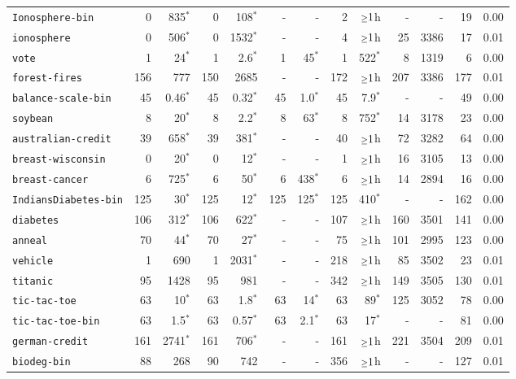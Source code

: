 \begin{tabular}{lrrrrrrrrrrrr}
\texttt{Ionosphere-bin} & 0 & 835$^*$ & 0 & 108$^*$ & - & - & 2 & $\mathsmaller{\geq}1$h & - & - & 19 & 0.00\\
\texttt{ionosphere} & 0 & 506$^*$ & 0 & 1532$^*$ & - & - & 4 & $\mathsmaller{\geq}1$h & 25 & 3386 & 17 & 0.01\\
\texttt{vote} & 1 & 24$^*$ & 1 & 2.6$^*$ & 1 & 45$^*$ & 1 & 522$^*$ & 8 & 1319 & 6 & 0.00\\
\texttt{forest-fires} & 156 & 777 & 150 & 2685 & - & - & 172 & $\mathsmaller{\geq}1$h & 207 & 3386 & 177 & 0.01\\
\texttt{balance-scale-bin} & 45 & 0.46$^*$ & 45 & 0.32$^*$ & 45 & 1.0$^*$ & 45 & 7.9$^*$ & - & - & 49 & 0.00\\
\texttt{soybean} & 8 & 20$^*$ & 8 & 2.2$^*$ & 8 & 63$^*$ & 8 & 752$^*$ & 14 & 3178 & 23 & 0.00\\
\texttt{australian-credit} & 39 & 658$^*$ & 39 & 381$^*$ & - & - & 40 & $\mathsmaller{\geq}1$h & 72 & 3282 & 64 & 0.00\\
\texttt{breast-wisconsin} & 0 & 20$^*$ & 0 & 12$^*$ & - & - & 1 & $\mathsmaller{\geq}1$h & 16 & 3105 & 13 & 0.00\\
\texttt{breast-cancer} & 6 & 725$^*$ & 6 & 50$^*$ & 6 & 438$^*$ & 6 & $\mathsmaller{\geq}1$h & 14 & 2894 & 16 & 0.00\\
\texttt{IndiansDiabetes-bin} & 125 & 30$^*$ & 125 & 12$^*$ & 125 & 125$^*$ & 125 & 410$^*$ & - & - & 162 & 0.00\\
\texttt{diabetes} & 106 & 312$^*$ & 106 & 622$^*$ & - & - & 107 & $\mathsmaller{\geq}1$h & 160 & 3501 & 141 & 0.00\\
\texttt{anneal} & 70 & 44$^*$ & 70 & 27$^*$ & - & - & 75 & $\mathsmaller{\geq}1$h & 101 & 2995 & 123 & 0.00\\
\texttt{vehicle} & 1 & 690 & 1 & 2031$^*$ & - & - & 218 & $\mathsmaller{\geq}1$h & 85 & 3502 & 23 & 0.01\\
\texttt{titanic} & 95 & 1428 & 95 & 981 & - & - & 342 & $\mathsmaller{\geq}1$h & 149 & 3505 & 130 & 0.01\\
\texttt{tic-tac-toe} & 63 & 10$^*$ & 63 & 1.8$^*$ & 63 & 14$^*$ & 63 & 89$^*$ & 125 & 3052 & 78 & 0.00\\
\texttt{tic-tac-toe-bin} & 63 & 1.5$^*$ & 63 & 0.57$^*$ & 63 & 2.1$^*$ & 63 & 17$^*$ & - & - & 81 & 0.00\\
\texttt{german-credit} & 161 & 2741$^*$ & 161 & 706$^*$ & - & - & 161 & $\mathsmaller{\geq}1$h & 221 & 3504 & 209 & 0.01\\
\texttt{biodeg-bin} & 88 & 268 & 90 & 742 & - & - & 356 & $\mathsmaller{\geq}1$h & - & - & 127 & 0.01\\

\end{tabular}
